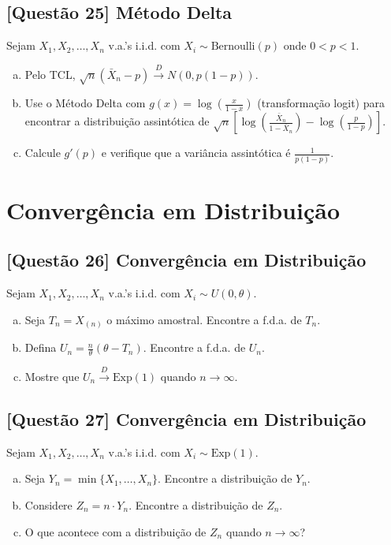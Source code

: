 \documentclass[12pt,a4paper]{article}
\begin{document}
\subsection*{[Questão 25] Método Delta}

Sejam $X_1, X_2, \ldots, X_n$ v.a.'s i.i.d. com $X_i \sim \text{Bernoulli}(p)$ onde $0 < p < 1$.

\begin{enumerate}[(a)]
    \item Pelo TCL, $\sqrt{n}(\bar{X}_n - p) \xrightarrow{D} N(0, p(1-p))$.
    \item Use o Método Delta com $g(x) = \log\left(\frac{x}{1-x}\right)$ (transformação logit) para encontrar a distribuição assintótica de $\sqrt{n}\left[\log\left(\frac{\bar{X}_n}{1-\bar{X}_n}\right) - \log\left(\frac{p}{1-p}\right)\right]$.
    \item Calcule $g'(p)$ e verifique que a variância assintótica é $\frac{1}{p(1-p)}$.
\end{enumerate}

\section{Convergência em Distribuição}

\subsection*{[Questão 26] Convergência em Distribuição}

Sejam $X_1, X_2, \ldots, X_n$ v.a.'s i.i.d. com $X_i \sim U(0, \theta)$.

\begin{enumerate}[(a)]
    \item Seja $T_n = X_{(n)}$ o máximo amostral. Encontre a f.d.a. de $T_n$.
    \item Defina $U_n = \frac{n}{\theta}(\theta - T_n)$. Encontre a f.d.a. de $U_n$.
    \item Mostre que $U_n \xrightarrow{D} \text{Exp}(1)$ quando $n \to \infty$.
\end{enumerate}

\subsection*{[Questão 27] Convergência em Distribuição}

Sejam $X_1, X_2, \ldots, X_n$ v.a.'s i.i.d. com $X_i \sim \text{Exp}(1)$.

\begin{enumerate}[(a)]
    \item Seja $Y_n = \min\{X_1, \ldots, X_n\}$. Encontre a distribuição de $Y_n$.
    \item Considere $Z_n = n \cdot Y_n$. Encontre a distribuição de $Z_n$.
    \item O que acontece com a distribuição de $Z_n$ quando $n \to \infty$?
\end{enumerate}
\end{document}
